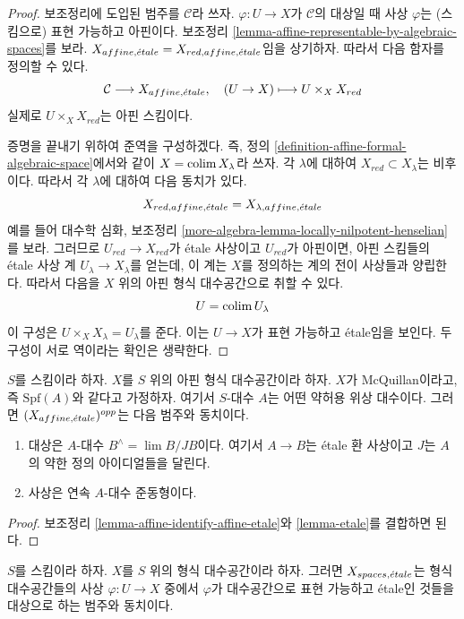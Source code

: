 \begin{proof}
보조정리에 도입된 범주를 $\mathcal{C}$라 쓰자.
$\varphi : U \to X$가 $\mathcal{C}$의 대상일 때 사상 $\varphi$는 (스킴으로) 표현
가능하고 아핀이다. 보조정리
\ref{lemma-affine-representable-by-algebraic-spaces}를 보라.
$X_{affine, {\acute{e}tale}} = X_{red, affine, {\acute{e}tale}}$임을 상기하자.
따라서 다음 함자를 정의할 수 있다.
$$
\mathcal{C} \longrightarrow X_{affine, {\acute{e}tale}},\quad
(U \to X) \longmapsto U \times_X X_{red}
$$
실제로 $U \times_X X_{red}$는 아핀 스킴이다.

\medskip\noindent
증명을 끝내기 위하여 준역을 구성하겠다.
즉, 정의 \ref{definition-affine-formal-algebraic-space}에서와 같이
$X = \mathop{\mathrm{colim}}\nolimits X_\lambda$라 쓰자. 각 $\lambda$에 대하여
$X_{red} \subset X_\lambda$는 비후이다. 따라서 각 $\lambda$에 대하여
다음 동치가 있다.
$$
X_{red, affine, {\acute{e}tale}} = X_{\lambda, affine, {\acute{e}tale}}
$$
예를 들어 대수학 심화, 보조정리
\ref{more-algebra-lemma-locally-nilpotent-henselian}를 보라.
그러므로 $U_{red} \to X_{red}$가 \'etale 사상이고
$U_{red}$가 아핀이면, 아핀 스킴들의 \'etale 사상 계
$U_\lambda \to X_\lambda$를 얻는데, 이 계는 $X$를 정의하는 계의
전이 사상들과 양립한다.
따라서 다음을 $X$ 위의 아핀 형식 대수공간으로 취할 수 있다.
$$
U = \mathop{\mathrm{colim}}\nolimits U_\lambda
$$
이 구성은 $U \times_X X_\lambda = U_\lambda$를 준다.
이는 $U \to X$가 표현 가능하고 \'etale임을 보인다.
두 구성이 서로 역이라는 확인은 생략한다.
\end{proof}

\begin{lemma}
\label{lemma-affine-etale-mcquillan}
$S$를 스킴이라 하자. $X$를 $S$ 위의 아핀 형식
대수공간이라 하자. $X$가 McQuillan이라고, 즉
$\text{Spf}(A)$와 같다고 가정하자. 여기서 $S$-대수 $A$는 어떤
약허용 위상 대수이다.
그러면 $(X_{affine, {\acute{e}tale}})^{opp}$는 다음 범주와 동치이다.
\begin{enumerate}
\item 대상은 $A$-대수 $B^\wedge = \lim B/JB$이다. 여기서
$A \to B$는 \'etale 환 사상이고 $J$는 $A$의 약한 정의
아이디얼들을 달린다.
\item 사상은 연속 $A$-대수 준동형이다.
\end{enumerate}
\end{lemma}

\begin{proof}
보조정리 \ref{lemma-affine-identify-affine-etale}와 \ref{lemma-etale}를
결합하면 된다.
\end{proof}

\begin{lemma}
\label{lemma-identify-spaces-etale}
$S$를 스킴이라 하자. $X$를 $S$ 위의 형식 대수공간이라 하자.
그러면 $X_{spaces, {\acute{e}tale}}$는 형식 대수공간들의 사상
$\varphi : U \to X$ 중에서 $\varphi$가 대수공간으로 표현 가능하고
\'etale인 것들을 대상으로 하는 범주와 동치이다.
\end{lemma}

